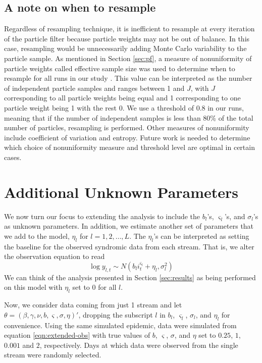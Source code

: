 \documentclass{elsarticle}
\begin{document}
\subsection{A note on when to resample}

Regardless of resampling technique, it is inefficient to resample at every iteration of the particle filter because particle weights may not be out of balance. In this case, resampling would be unnecessarily adding Monte Carlo variability to the particle sample. As mentioned in Section \ref{sec:pf}, a measure of nonuniformity of particle weights called effective sample size was used to determine when to resample for all runs in our study \citep{Liu:Chen:Wong:reje:1998}. This value can be interpreted as the number of independent particle samples and ranges between 1 and $J$, with $J$ corresponding to all particle weights being equal and 1 corresponding to one particle weight being 1 with the rest 0. We use a threshold of 0.8 in our runs, meaning that if the number of independent samples is less than 80\% of the total number of particles, resampling is performed. Other measures of nonuniformity include coefficient of variation and entropy. Future work is needed to determine which choice of nonuniformity measure and threshold level are optimal in certain cases.

\section{Additional Unknown Parameters \label{sec:extend}}

We now turn our focus to extending the analysis to include the $b_l$'s, $\varsigma_l$'s, and $\sigma_l$'s as unknown parameters. In addition, we estimate another set of parameters that we add to the model, $\eta_l$ for $l = 1,2,\ldots,L$. The $\eta_l$'s can be interpreted as setting the baseline for the observed syndromic data from each stream. That is, we alter the observation equation to read
\begin{equation}
\log y_{l,t} \sim N\left(b_li_t^{\varsigma_l} + \eta_l,\sigma_l^2\right) \label{eqn:extended-obs}
\end{equation}
\noindent We can think of the analysis presented in Section \ref{sec:results} as being performed on this model with $\eta_l$ set to 0 for all $l$.

Now, we consider data coming from just 1 stream and let $\theta = (\beta, \gamma, \nu, b, \varsigma, \sigma, \eta)'$, dropping the subscript $l$ in $b_l$, $\varsigma_l$, $\sigma_l$, and $\eta_l$ for convenience. Using the same simulated epidemic, data were simulated from equation \eqref{eqn:extended-obs} with true values of $b$, $\varsigma$, $\sigma$, and $\eta$ set to $0.25$, $1$, $0.001$ and $2$, respectively. Days at which data were observed from the single stream were randomly selected.
\end{document}
